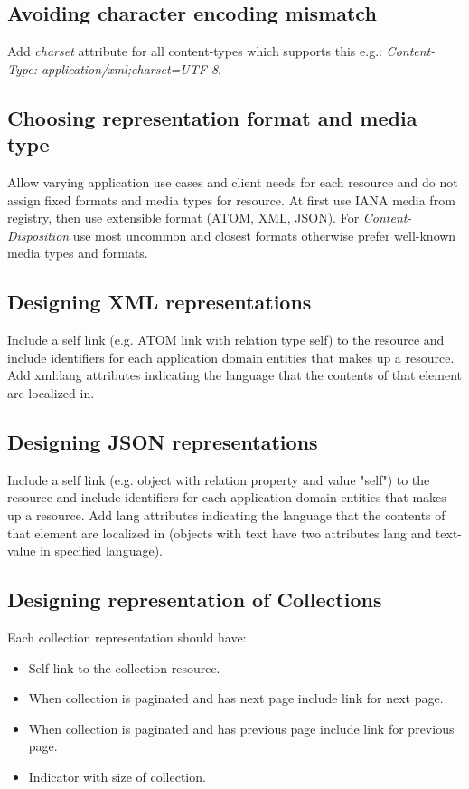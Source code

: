 \documentclass[11pt,a4paper]{article}
\begin{document}
\subsection{Avoiding character encoding mismatch}
Add \textit{charset} attribute for all content-types which supports this e.g.: \textit{Content-Type: application/xml;charset=UTF-8}.

\subsection{Choosing representation format and media type}
Allow varying application use cases and client needs for each resource and do not assign fixed formats and media types for resource. At first use IANA media from registry, then use extensible format (ATOM, XML, JSON). For \textit{Content-Disposition} use most uncommon and closest formats otherwise prefer well-known media types and formats.

\subsection{Designing XML representations}
Include a self link (e.g. ATOM link with relation type self) to the resource and include identifiers for each application domain entities that makes up a resource. Add xml:lang attributes indicating the language that the contents of that element are localized in.

\subsection{Designing JSON representations}
Include a self link (e.g. object with relation property and value "self") to the resource and include identifiers for each application domain entities that makes up a resource. Add lang attributes indicating the language that the contents of that element are localized in (objects with text have two attributes lang and text-value in specified language).

\subsection{Designing representation of Collections}
Each collection representation should have:
\begin{itemize}
	\item Self link to the collection resource.
	\item When collection is paginated and has next page include link for next page.
	\item When collection is paginated and has previous page include link for previous page.
	\item Indicator with size of collection.
\end{itemize}
\end{document}
